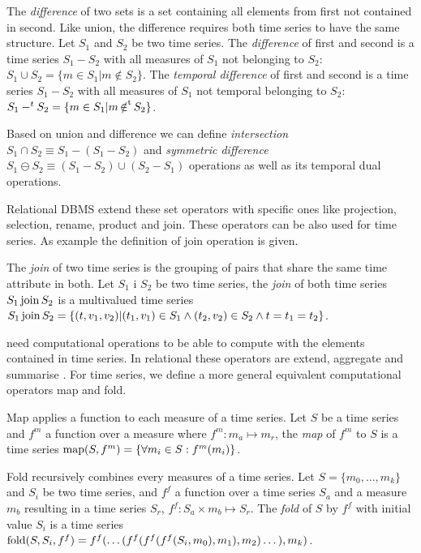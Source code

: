 The \emph{difference} of two sets is a set containing all elements
from first not contained in second. Like union, the difference
requires both time series to have the same structure. %
Let $S_1$ and $S_2$ be two time series. The \emph{difference} of first
and second is a time series $S_1 - S_2$ with all measures of $S_1$ not
belonging to $S_2$: $S_1 \cup S_2 = \{ m \in S_1 | m \notin S_2
\}$. The \emph{temporal difference} of first and second is a time
series $S_1 - S_2$ with all measures of $S_1$ not temporal belonging
to $S_2$: $S_1 -^t S_2 = \{ m \in S_1 | m \operatorname*{\notin^t} S_2 \}$.


Based on union and difference we can define \emph{intersection} $S_1\cap
S_2 \equiv S_1 - (S_1 - S_2)$ and \emph{symmetric difference} $S_1 \ominus
S_2 \equiv (S_1 - S_2) \cup (S_2 - S_1)$ operations as well as its
temporal dual operations.


Relational DBMS extend these set operators with specific ones like
projection, selection, rename, product and join. These operators can
be also used for time series. As example the definition of join
operation is given.


The \emph{join} of two time series is the grouping of pairs that share
the same time attribute in both.  Let $S_1$ i $S_2$ be two time series,
the \emph{join} of both time series $S_1 \operatorname*{join} S_2$ is a multivalued
time series $S_1 \operatorname*{join} S_2 = \{ (t,v_1,v_2) | (t_1,v_1) \in S_1 \wedge
(t_2,v_2) \in S_2 \wedge t=t_1=t_2 \}$.


 need computational operations to be able to compute with
the elements contained in time series. In relational  these
operators are extend, aggregate and summarise
\cite{date:introduction}. For time series, we define a more general
equivalent computational operators map and fold.


Map applies a function to each measure of a time series.  Let $S$ be a
time series and $f^m$ a function over a measure where $f^m:m_a\mapsto
m_r$, the \emph{map} of $f^m$ to $S$ is a time series $\operatorname*{map}(S,f^m) =
\{\forall m_i\in S : f^m(m_i) \}$.

Fold recursively combines every measures of a time series.  Let
$S=\{m_0, \dotsc, m_k\}$ and $S_i$ be two time series, and $f^f$ a
function over a time series $S_a$ and a measure $m_b$ resulting in a
time series $S_r$, $f^f: S_a \times m_b \mapsto S_r$. The \emph{fold}
of $S$ by $f^f$ with initial value $S_i$ is a time series
$\operatorname*{fold}(S,S_i,f^f) = f^f(\dots( f^f(f^f(f^f(S_i,m_0),\allowbreak
m_1),\allowbreak m_2 )\dots),\allowbreak m_k)$.


